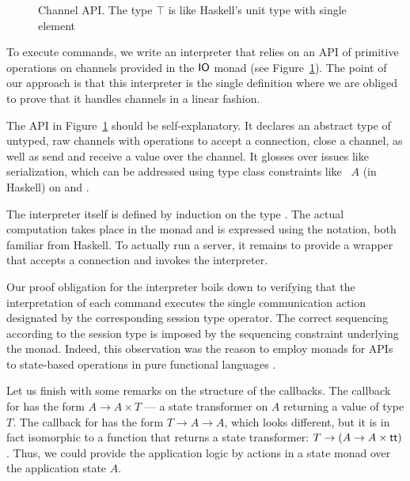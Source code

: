 \documentclass[acmsmall,review,anonymous,screen]{acmart}
\begin{document}
\begin{figure}[tp]
\stPostulates  
  \caption{Channel API. The type $\top$ is like
  Haskell's unit type with single element {\Att}}
  \label{fig:channel-api}
\end{figure}
To execute commands, we write an
interpreter that relies on an API of primitive operations on channels provided
in the $\AIO$ monad (see Figure~\ref{fig:channel-api}). The point of our approach is that this
interpreter is the single definition where we are obliged to prove
that it handles channels in a linear fashion. 

The API in Figure~\ref{fig:channel-api} should be self-explanatory. It declares an abstract type of
untyped, raw channels with operations to accept a connection, close a channel, as
well as send and receive a value over the channel. It glosses over issues like
serialization, which can be addressed using type class constraints like
{\ASerialize~$A$} (in Haskell) on {\AprimSend} and {\AprimRecv}.

The interpreter itself is defined by induction on the type
{\ACommand}. The actual computation takes place in the {\AIO} monad and is expressed using the {\Ado} notation, both
familiar from Haskell. 
\stExecutorSignature\vspace{-1.5\baselineskip}
\stExecutor
To actually run a server, it remains to provide a wrapper that accepts
a connection and invokes the interpreter.
\stAcceptor

Our proof obligation for the interpreter boils down to verifying that
the interpretation of each command executes the single communication
action designated by the corresponding session type operator. The
correct sequencing according to the session type is imposed by the
sequencing constraint underlying the {\AIO} monad. Indeed, this
observation was the reason to employ monads for APIs to state-based
operations in pure functional languages \cite{DBLP:conf/popl/JonesW93}.

Let us finish with some remarks on the structure of the callbacks. The
callback for {\ACSEND} has the form $A \to A \times T$ --- a state
transformer on $A$ returning a value of type $T$. The callback for
{\ACRECV} has the form $T \to A \to A$, which looks different, but it
is in fact isomorphic to a function that returns a state transformer:
$T \to (A \to A \times \Att)$. Thus, we could provide the
application logic by actions in a state monad over the application
state $A$.
\end{document}
